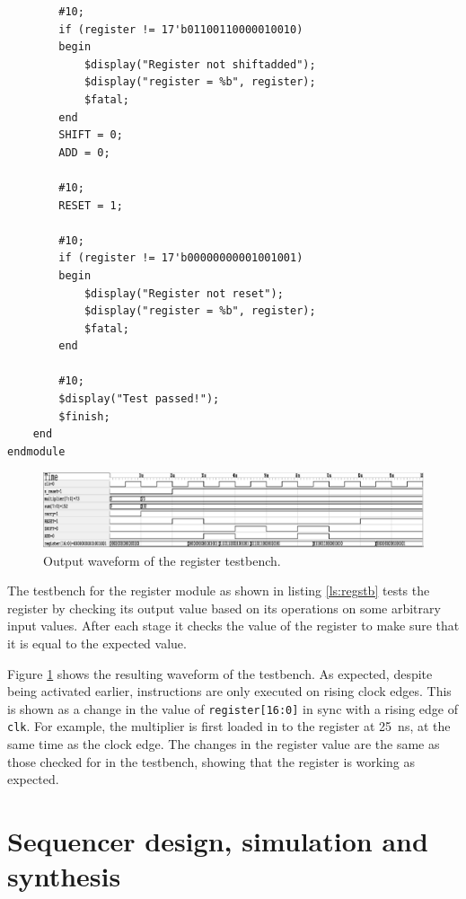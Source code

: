 \documentclass[a4paper,11pt]{article}
\begin{document}
\begin{lstlisting}
        #10;
        if (register != 17'b01100110000010010)
        begin
            $display("Register not shiftadded");
            $display("register = %b", register);
            $fatal;
        end
        SHIFT = 0;
        ADD = 0;
        
        #10;
        RESET = 1;
        
        #10;
        if (register != 17'b00000000001001001)
        begin
            $display("Register not reset");
            $display("register = %b", register);
            $fatal;
        end
        
        #10;
        $display("Test passed!");
        $finish;
    end
endmodule
\end{lstlisting}

\begin{figure}
    \centering
        \includegraphics[scale=0.65]{../out/regs_tb.eps}
    \caption{Output waveform of the register testbench.}
    \label{fig:regstbw}
\end{figure}

The testbench for the register module as shown in listing \ref{ls:regstb} tests the register by checking its output value based on its operations on some arbitrary input values. After each stage it checks the value of the register to make sure that it is equal to the expected value.

Figure \ref{fig:regstbw} shows the resulting waveform of the testbench. As expected, despite being activated earlier, instructions are only executed on rising clock edges. This is shown as a change in the value of \lstinline{register[16:0]} in sync with a rising edge of \lstinline{clk}. For example, the multiplier is first loaded in to the register at \SI{25}{\nano\second}, at the same time as the clock edge. The changes in the register value are the same as those checked for in the testbench, showing that the register is working as expected.

\section{Sequencer design, simulation and synthesis}
\end{document}
